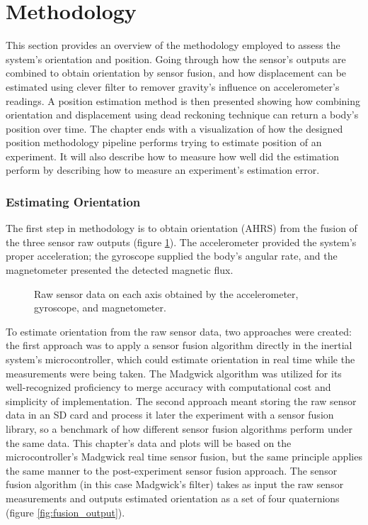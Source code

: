 \section{Methodology}

This section provides an overview of the methodology employed to assess the system's orientation and position. Going through how the sensor's outputs are combined to obtain orientation by sensor fusion, and how displacement can be estimated using clever filter to remover gravity's influence on accelerometer's readings. A position estimation method is then presented showing how combining orientation and displacement using dead reckoning technique can return a body's position over time. The chapter ends with a visualization of how the designed position methodology pipeline performs trying to estimate position of an experiment. It will also describe how to measure how well did the estimation perform by describing how to measure an experiment's estimation error.


\subsubsection{Estimating Orientation}

The first step in methodology is to obtain orientation (AHRS) from the fusion of the three sensor raw outputs (figure \ref{fig:raw}). The accelerometer provided the system's proper acceleration; the gyroscope supplied the body's angular rate, and the magnetometer presented the detected magnetic flux.

\begin{figure}[!h]
  \centering
  \resizebox{0.75\linewidth}{!}{}
  \caption{Raw sensor data on each axis obtained by the accelerometer, gyroscope, and magnetometer.}
  \label{fig:raw}
\end{figure}

To estimate orientation from the raw sensor data, two approaches were created: the first approach was to apply a sensor fusion algorithm directly in the inertial system's microcontroller, which could estimate orientation in real time while the measurements were being taken. The Madgwick algorithm was utilized for its well-recognized proficiency to merge accuracy with computational cost and simplicity of implementation. The second approach meant storing the raw sensor data in an SD card and process it later the experiment with a sensor fusion library, so a benchmark of how different sensor fusion algorithms perform under the same data. This chapter's data and plots will be based on the microcontroller's Madgwick real time sensor fusion, but the same principle applies the same manner to the post-experiment sensor fusion approach. The sensor fusion algorithm (in this case Madgwick's filter) takes as input the raw sensor measurements and outputs estimated orientation as a set of four quaternions (figure \ref{fig:fusion_output}).

